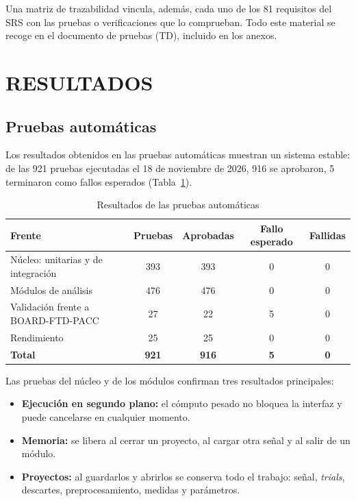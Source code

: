 \documentclass[12pt,letterpaper,oneside]{article}
\newcommand{\capitulo}[1]{\clearpage\section{#1}}
\begin{document}
Una matriz de trazabilidad vincula, además, cada uno de los 81 requisitos del SRS con las pruebas o verificaciones que lo comprueban. Todo este material se recoge en el documento de pruebas (TD), incluido en los anexos.

\capitulo{RESULTADOS}

\subsection{Pruebas automáticas}
\label{sec:resultados_automaticas}

Los resultados obtenidos en las pruebas automáticas muestran un sistema estable: de las 921 pruebas ejecutadas el 18 de noviembre de 2026, 916 se aprobaron, 5 terminaron como fallos esperados (Tabla~\ref{tab:resultados_automaticas}).

\begin{table}[H]
\centering
\scriptsize
\renewcommand{\arraystretch}{1.3}
\begin{tabularx}{\textwidth}{|>{\raggedright\arraybackslash}X|c|c|c|c|}
\hline
\textbf{Frente} & \textbf{Pruebas} & \textbf{Aprobadas} & \textbf{Fallo esperado} & \textbf{Fallidas} \\
\hline
Núcleo: unitarias y de integración & 393 & 393 & 0 & 0 \\
\hline
Módulos de análisis & 476 & 476 & 0 & 0 \\
\hline
Validación frente a BOARD-FTD-PACC & 27 & 22 & 5 & 0 \\
\hline
Rendimiento & 25 & 25 & 0 & 0 \\
\hline
\textbf{Total} & \textbf{921} & \textbf{916} & \textbf{5} & \textbf{0} \\
\hline
\end{tabularx}
\caption{Resultados de las pruebas automáticas}
\label{tab:resultados_automaticas}
\end{table}

Las pruebas del núcleo y de los módulos confirman tres resultados principales:

\begin{itemize}
  \item \textbf{Ejecución en segundo plano:} el cómputo pesado no bloquea la interfaz y puede cancelarse en cualquier momento.
  \item \textbf{Memoria:} se libera al cerrar un proyecto, al cargar otra señal y al salir de un módulo.
  \item \textbf{Proyectos:} al guardarlos y abrirlos se conserva todo el trabajo: señal, \textit{trials}, descartes, preprocesamiento, medidas y parámetros.
\end{itemize}
\end{document}
